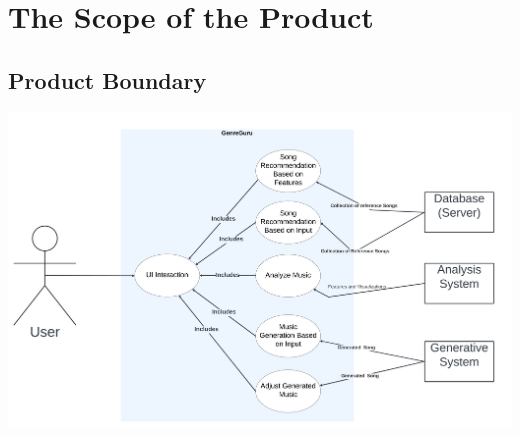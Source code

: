 \documentclass[12pt]{article}
\begin{document}
\section{The Scope of the Product}
\subsection{Product Boundary}
\includegraphics[width=\textwidth]{product_boundary.png} \\
\end{document}
